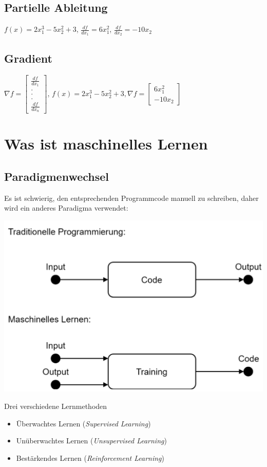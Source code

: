 \documentclass{report}
\begin{document}
\subsection{Partielle Ableitung}
$f(x) = 2x_1^3 - 5x_2^2 + 3$, $\frac{df}{dx_1} = 6x_1^2$, $\frac{df}{dx_2} = -10x_2$
\subsection{Gradient}
$\nabla f = \begin{bmatrix}\frac{df}{dx_1}\\ . \\. \\.\\\frac{df}{dx_n}\end{bmatrix}$, $f(x) = 2x_1^3 - 5x_2^2 + 3, \nabla f = \begin{bmatrix}6x_1^2\\-10x_2\end{bmatrix}$

\section{Was ist maschinelles Lernen}
\subsection{Paradigmenwechsel}
Es ist schwierig, den entsprechenden Programmcode manuell zu schreiben, daher wird ein anderes Paradigma verwendet:
\begin{center}
  \includegraphics[scale=.4]{ml01_2}
\end{center}
Drei verschiedene Lernmethoden
\begin{itemize}
  \item Überwachtes Lernen (\textit{Supervised Learning})
  \item Unüberwachtes Lernen (\textit{Unsupervised Learning})
  \item Bestärkendes Lernen (\textit{Reinforcement Learning})
\end{itemize}
\end{document}
